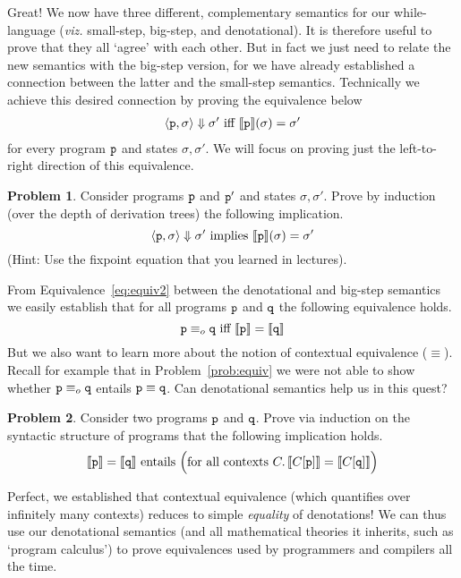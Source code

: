\documentclass[a4paper, 11pt]{article}
\theoremstyle{definition}
\newtheorem{problem}{Problem}
\begin{document}
Great! We now have three different, complementary semantics for our
while-language (\emph{viz.} small-step, big-step, and denotational). It is therefore useful
to prove that they all `agree' with each other. But in fact we just need to relate
the new semantics with the big-step version, for we have already established a
connection between the latter and the small-step semantics. Technically we
achieve this desired connection by proving the equivalence below 
      \begin{align}
              \label{eq:equiv2}
              \langle \mathtt{p}, \sigma \rangle \Downarrow \sigma' \text{ iff }
              \llbracket \mathtt{p} \rrbracket(\sigma) = \sigma' 
      \end{align}
for every program $\mathtt{p}$ and states $\sigma,\sigma'$.  We will focus on
proving just the left-to-right direction of this  equivalence.
\begin{problem}
       Consider programs $\mathtt{p}$ and $\mathtt{p'}$ and states
       $\sigma,\sigma'$. Prove by induction (over the depth of
       derivation trees) the following implication.
       \[
               \langle \mathtt{p}, \sigma \rangle
               \Downarrow \sigma' \text{ implies } \llbracket \mathtt{p} \rrbracket(\sigma) = \sigma' 
       \]
       (Hint: Use the fixpoint equation that you learned in lectures).
\end{problem}

From Equivalence~\eqref{eq:equiv2} between the denotational and big-step semantics
we easily establish that for all programs $\mathtt{p}$ and $\mathtt{q}$ the
following equivalence holds.
\[
        \mathtt{p} \equiv_o \mathtt{q} \text{ iff } \llbracket \mathtt{p} \rrbracket = \llbracket \mathtt{q} \rrbracket
\]
But we also want to learn more about the notion of contextual equivalence
($\equiv$). Recall for example that in Problem~\eqref{prob:equiv} we were not
able to show whether $\mathtt{p} \equiv_o \mathtt{q}$ entails $\mathtt{p} \equiv
\mathtt{q}$. Can denotational semantics help us in this quest?

\begin{problem}
        Consider two programs $\mathtt{p}$ and $\mathtt{q}$. Prove via induction on
        the syntactic structure of programs that the following implication
        holds.  
        \[
                \llbracket \mathtt{p} \rrbracket = \llbracket \mathtt{q} \rrbracket \text{ entails }
                \Big ( \text{for all contexts } C. \,
                \llbracket C[\mathtt{p}] \rrbracket = \llbracket C[\mathtt{q}] \rrbracket \Big )
        \]
\end{problem}

Perfect, we established that contextual equivalence (which quantifies over
infinitely many contexts) reduces to simple \emph{equality} of denotations! We
can thus use our denotational semantics (and all mathematical theories it
inherits, such as `program calculus') to prove equivalences used by programmers
and compilers all the time.
\end{document}
